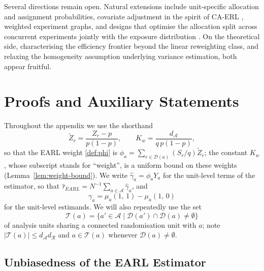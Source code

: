 \documentclass[sigconf,nonacm]{acmart}
\newcounter{assumption}
\begin{document}
Several directions remain open. Natural extensions include unit-specific allocation and assignment probabilities, covariate adjustment in the spirit of CA-ERL \cite{shi2025scalableanalysisbipartiteexperiments}, weighted experiment graphs, and designs that optimise the allocation split across concurrent experiments jointly with the exposure distribution \cite{harshaw2023erl,brennan2022cluster}. On the theoretical side, characterising the efficiency frontier beyond the linear reweighting class, and relaxing the homogeneity assumption underlying variance estimation, both appear fruitful.




\appendix

\section{Proofs and Auxiliary Statements}\label{app:proofs}

Throughout the appendix we use the shorthand
\begin{equation}\label{def:Kw}
    \tilde Z_r = \frac{Z_r-p}{p(1-p)},\qquad
    K_w = \frac{d_{\mathcal A}}{q\,p(1-p)},
\end{equation}
so that the EARL weight \eqref{def:phi} is $\phi_a = \sum_{r\in\mathcal D(a)}(S_r/q)\tilde Z_r$; the constant $K_w$, whose subscript stands for ``weight'', is a uniform bound on these weights (Lemma~\ref{lem:weight-bound}). We write $\hat\gamma_a=\phi_aY_a$ for the unit-level terms of the estimator, so that $\hat\tau_{EARL}=N^{-1}\sum_{a\in\mathcal A}\hat\gamma_a$, and
\begin{equation}\label{def:gamma-a}
    \gamma_a = \mu_a(1,\,1) - \mu_a(1,\,0)
\end{equation}
for the unit-level estimands. We will also repeatedly use the set
\begin{equation*}
    \mathcal T(a) = \{a'\in\mathcal A\mid \mathcal D(a')\cap \mathcal D(a) \neq \emptyset\}
\end{equation*}
of analysis units sharing a connected randomisation unit with $a$; note $|\mathcal T(a)|\le d_{\mathcal A}d_{\mathcal R}$ and $a\in\mathcal T(a)$ whenever $\mathcal D(a)\neq\emptyset$.

\subsection{Unbiasedness of the EARL Estimator}
\end{document}
